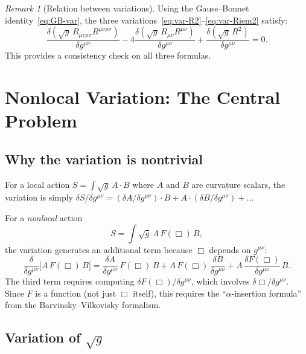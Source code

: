 \documentclass[12pt,a4paper]{article}
\theoremstyle{definition}
\theoremstyle{remark}
\newtheorem{remark}[proposition]{Remark}
\newcommand{\Rsq}{R_{\mu\nu\rho\sigma}R^{\mu\nu\rho\sigma}}
\newcommand{\Ricsq}{R_{\mu\nu}R^{\mu\nu}}
\begin{document}
\begin{remark}[Relation between variations]
Using the Gauss--Bonnet identity~\eqref{eq:GB-var}, the three
variations~\eqref{eq:var-R2}--\eqref{eq:var-Riem2} satisfy:
\begin{equation}
  \frac{\delta(\sqrt{g}\,\Rsq)}{\delta g^{\mu\nu}}
  - 4\frac{\delta(\sqrt{g}\,\Ricsq)}{\delta g^{\mu\nu}}
  + \frac{\delta(\sqrt{g}\,R^2)}{\delta g^{\mu\nu}} = 0.
\end{equation}
This provides a consistency check on all three formulas.
\end{remark}


\section{Nonlocal Variation: The Central Problem}
\label{sec:nonlocal-variation}

\subsection{Why the variation is nontrivial}

For a local action $S = \int\sqrt{g}\,A\cdot B$ where $A$ and $B$ are
curvature scalars, the variation is simply
$\delta S/\delta g^{\mu\nu} = (\delta A/\delta g^{\mu\nu})\cdot B
+ A\cdot(\delta B/\delta g^{\mu\nu}) + \ldots$

For a \emph{nonlocal} action
\begin{equation}\label{eq:nonlocal-action-schematic}
  S = \int\sqrt{g}\,A\,F(\Box)\,B,
\end{equation}
the variation generates an additional term because $\Box$ depends on
$g^{\mu\nu}$:
\begin{equation}\label{eq:central-difficulty}
  \frac{\delta}{\delta g^{\mu\nu}}\big[A\,F(\Box)\,B\big]
  = \frac{\delta A}{\delta g^{\mu\nu}}\,F(\Box)\,B
  + A\,F(\Box)\,\frac{\delta B}{\delta g^{\mu\nu}}
  + A\,\frac{\delta F(\Box)}{\delta g^{\mu\nu}}\,B.
\end{equation}
The third term requires computing
$\delta F(\Box)/\delta g^{\mu\nu}$, which involves
$\delta\Box/\delta g^{\mu\nu}$.  Since $F$ is a function (not just
$\Box$ itself), this requires the ``$\alpha$-insertion formula''
from the Barvinsky--Vilkovisky formalism.

\subsection{Variation of $\sqrt{g}$}
\end{document}
